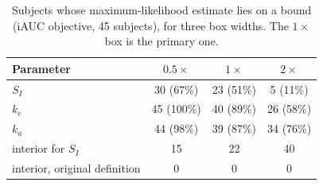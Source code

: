 \begin{table}[t]
\centering\small
\begin{tabular}{lccc}
\toprule
Parameter & $0.5\times$ & $1\times$ & $2\times$ \\
\midrule
$S_I$ & 30 (67\%) & 23 (51\%) & 5 (11\%) \\
$k_e$ & 45 (100\%) & 40 (89\%) & 26 (58\%) \\
$k_a$ & 44 (98\%) & 39 (87\%) & 34 (76\%) \\
interior for $S_I$ & 15 & 22 & 40 \\
interior, original definition & 0 & 0 & 0 \\
\bottomrule
\end{tabular}
\caption{Subjects whose maximum-likelihood estimate lies on a bound (iAUC objective, 45 subjects), for three box widths. The $1\times$ box is the primary one.}
\label{tab:pinned}
\end{table}
